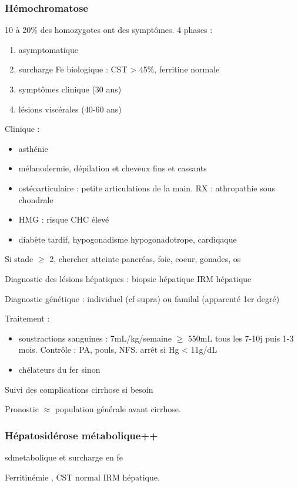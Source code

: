 \documentclass[11pt]{article}
\begin{document}
\subsubsection{Hémochromatose}
\label{sec:orgafef2b7}
10 à 20\% des homozygotes ont des symptômes. 4 phases :
\begin{enumerate}
\item asymptomatique
\item surcharge Fe biologique : CST > 45\%, ferritine normale
\item symptômes clinique (30 ans)
\item lésions viscérales (40-60 ans)
\end{enumerate}

Clinique : 
\begin{itemize}
\item asthénie
\item mélanodermie, dépilation et cheveux fins et cassants
\item ostéoarticulaire : petite articulations de la main. RX : athropathie sous
chondrale
\item HMG : risque CHC élevé
\item diabète tardif, hypogonadisme hypogonadotrope, cardiqaque
\end{itemize}

Si stade \(\ge\) 2, chercher atteinte pancréas, foie, coeur, gonades, os

Diagnostic des lésions hépatiques : biopsie hépatique \textpm{} IRM hépatique

Diagnostic génétique : individuel (cf supra) ou familal (apparenté 1er degré)

Traitement : 
\begin{itemize}
\item soustractions sanguines : 7mL/kg/semaine \(\ge\) 550mL tous les 7-10j puis 1-3
mois. Contrôle : PA, pouls, NFS. \danger arrêt si Hg < 11g/dL
\item chélateurs du fer sinon
\end{itemize}
Suivi des complications cirrhose si besoin

Pronostic \(\approx\) population générale avant cirrhose.

\subsubsection{Hépatosidérose métabolique++}
\label{sec:org449e6d7}
\gls{sdmetabolique} et surcharge en fe

Ferritinémie \inc, CST normal \thus IRM hépatique.
\end{document}
